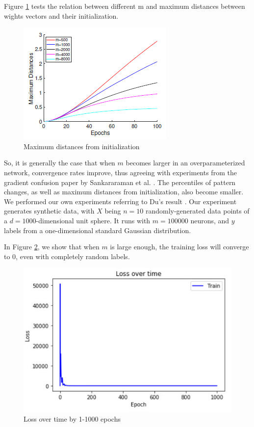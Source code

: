 \documentclass{article}
\begin{document}
Figure \ref{fig:maxdistance} tests the relation between different m and maximum distances between wights vectors and their initialization.
\begin{figure}[htb]
	\centering
    \includegraphics[scale= 0.5]{pics/overparameterization/maximumdistance.PNG}
    \caption{Maximum distances from initialization}
	\label{fig:maxdistance}
\end{figure}

So, it is generally the case that when $m$ becomes larger in an overparameterized network, convergence rates improve, thus agreeing with experiments from the gradient confusion paper by Sankararaman et al. \cite{gradient_confusion}. The percentiles of pattern changes, as well as maximum distances from initialization, also become smaller.
\\

We performed our own experiments referring to Du's result \cite{SimonDu}. Our experiment generates synthetic data, with $X$ being $n = 10$ randomly-generated data points of a $d = 1000$-dimensional unit sphere. It runs with $m = 100000$ neurons, and $y$ labels from a one-dimensional standard Gaussian distribution.

In Figure \ref{fig:zeroloss}, we show that when $m$ is large enough, the training loss will converge to 0, even with completely random labels. 

\begin{figure}[htb]
	\centering
    \includegraphics[scale = 0.5]{pics/overparameterization/loss_over_time_0-1k.jpg}
    \caption{Loss over time by 1-1000 epochs}
	\label{fig:zeroloss}
\end{figure}
\end{document}
